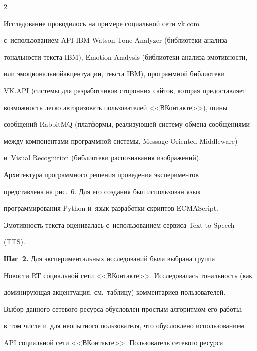 \begin{multicols}{2}





 

  Исследование проводилось на примере социальной сети {\sf vk.com} 

с~использованием API IBM Watson Tone Analyzer (библиотеки анализа 

тональности текста IBM), Emotion Analysis (библиотеки анализа эмотивности, 

или эмоциональной\linebreak акцентуации, текста IBM), программной библиотеки 

VK.API (сис\-те\-мы для разработчиков сторонних сайтов, которая предоставляет 

возможность легко авторизовать пользователей <<ВКонтакте>>), шины 

сообщений RabbitMQ (платформы, реализующей систему обмена сообщениями 

между компонентами программной системы, Message Oriented Middleware) 

и~Visual Recognition (библиотеки распознавания изображений). 

  

  Архитектура программного решения проведения экспериментов 

представлена на рис.~6. Для его создания был использован язык 

программирования Python и~язык разработки скриптов ECMAScript.

  

  Эмотивность текста оценивалась с~использованием сервиса Text to Speech 

(TTS). 



\bigskip



  \noindent

  \textbf{Шаг~2.} Для экспериментальных исследований была выбрана группа 

Новости RT социальной сети <<ВКонтакте>>. Исследовалась тональность (как 

доминирующая акцентуация, см.\ таблицу) комментариев пользователей. 

Выбор данного сетевого ресурса обусловлен простым алгоритмом его работы, 

в~том числе и~для неопытного пользователя, что обусловлено использованием 

API социальной сети <<ВКонтакте>>. Пользователь сетевого ресурса\linebreak\vspace*{-12pt}




\end{multicols}
